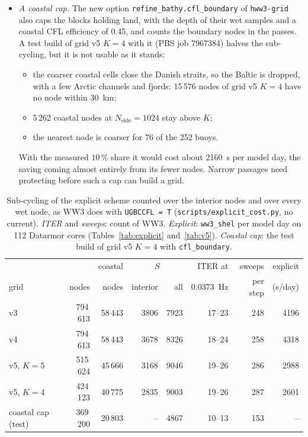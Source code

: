 \documentclass[11pt,a4paper]{article}
\newcommand{\nside}{N_{\mathrm{side}}}
\begin{document}
\begin{itemize}
these 12 hours $H_s$ differs from the default run by \SI{0.77}{mm} RMS at
the median node and \SI{1.2}{cm} at the 99th percentile. 68 coastal nodes
differ by more than \SI{5}{cm}, up to \SI{0.35}{m} in the Gulf of Maine
(local CFL number 2.6), and $T_{m02}$ by up to \SI{3.4}{s} at a coastal
node. There is no NaN, and the largest $H_s$ is \SI{7.45}{m} in both
runs.
\item \emph{A coastal cap.} The new option
\texttt{refine\_bathy.cfl\_boundary} of \texttt{hww3-grid} also caps the
blocks holding land, with the depth of their wet samples and a coastal
CFL efficiency of 0.45, and counts the boundary nodes in the passes. A
test build of grid v5 $K=4$ with it (PBS job 7967384) halves the
sub-cycling, but it is not usable as it stands:
  \begin{itemize}
  \item the coarser coastal cells close the Danish straits, so the Baltic
  is dropped, with a few Arctic channels and fjords: 15\,576 nodes of grid
  v5 $K=4$ have no node within \SI{30}{km};
  \item 5\,262 coastal nodes at $\nside=1024$ stay above $K$;
  \item the nearest node is coarser for 76 of the 252 buoys.
  \end{itemize}
With the measured 10\,\% share it would cost about \SI{2160}{s} per model
day, the saving coming almost entirely from its fewer nodes. Narrow
passages need protecting before such a cap can build a grid.
\end{itemize}

\begin{table}[H]
\centering\small
\begin{tabular}{lrrrrrrr}
\toprule
 & & coastal & \multicolumn{2}{c}{$S$} & ITER at & sweeps & explicit \\
grid & nodes & nodes & interior & all & \SI{0.0373}{Hz} & per step & (s/day) \\
\midrule
v3 & 794\,613 & 58\,443 & 3806 & 7923 & 17--23 & 248 & 4196 \\
v4 & 794\,613 & 58\,443 & 3678 & 8326 & 18--24 & 258 & 4318 \\
v5, $K=5$ & 515\,624 & 45\,666 & 3168 & 9046 & 19--26 & 286 & 2988 \\
v5, $K=4$ & 424\,123 & 40\,775 & 2835 & 9003 & 19--26 & 287 & 2601 \\
coastal cap (test) & 369\,200 & 20\,803 & -- & 4867 & 10--13 & 153 & -- \\
\bottomrule
\end{tabular}
\caption{Sub-cycling of the explicit scheme counted over the interior
nodes and over every wet node, as WW3 does with \texttt{UGBCCFL = T}
(\texttt{scripts/explicit\_cost.py}, no current). \emph{ITER} and
\emph{sweeps}: count of WW3. \emph{Explicit}: \texttt{ww3\_shel} per model
day on 112 Datarmor cores (Tables~\ref{tab:explicit} and~\ref{tab:v5}).
\emph{Coastal cap}: the test build of grid v5 $K=4$ with
\texttt{cfl\_boundary}.}
\label{tab:coastcfl}
\end{table}
\end{document}
